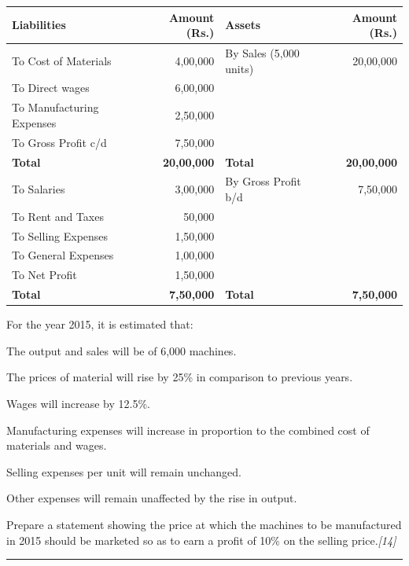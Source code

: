 \documentclass[11pt,a4paper]{article}
\newcommand{\pts}[1]{\hfill   \textit{[#1]}}
\begin{document}
\begin{center}
\small

\begin{tabular}{|l|r||l|r|}
\hline
   \textbf{Liabilities} &   \textbf{Amount (Rs.)} &   \textbf{Assets} &   \textbf{Amount (Rs.)} \\
\hline
To Cost of Materials & 4,00,000 & By Sales (5,000 units) & 20,00,000 \\
To Direct wages & 6,00,000 & & \\
To Manufacturing Expenses & 2,50,000 & & \\
To Gross Profit c/d & 7,50,000 & & \\
\hline
   \textbf{Total} &   \textbf{20,00,000} &   \textbf{Total} &   \textbf{20,00,000} \\
\hline
\hline
To Salaries & 3,00,000 & By Gross Profit b/d & 7,50,000 \\
To Rent and Taxes & 50,000 & & \\
To Selling Expenses & 1,50,000 & & \\
To General Expenses & 1,00,000 & & \\
To Net Profit & 1,50,000 & & \\
\hline
   \textbf{Total} &   \textbf{7,50,000} &   \textbf{Total} &   \textbf{7,50,000} \\
\hline
\end{tabular}
\end{center}

For the year 2015, it is estimated that:

\begin{parts}
  \item The output and sales will be of 6,000 machines.
  \item The prices of material will rise by 25\% in comparison to previous years.
  \item Wages will increase by 12.5\%.
  \item Manufacturing expenses will increase in proportion to the combined cost of materials and wages.
  \item Selling expenses per unit will remain unchanged.
  \item Other expenses will remain unaffected by the rise in output.
\end{parts}
Prepare a statement showing the price at which the machines to be manufactured in 2015 should be marketed so as to earn a profit of 10\% on the selling price.\pts{14}

\medskip\rule{\linewidth}{0.2pt}
\end{document}
